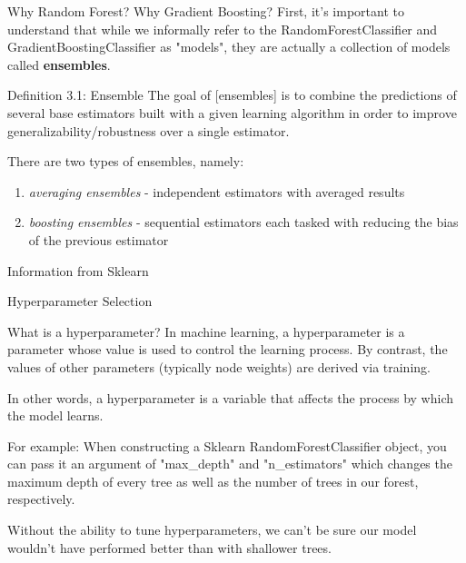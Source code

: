\documentclass[11pt]{beamer}
\begin{document}
\begin{frame}{Why Random Forest? Why Gradient Boosting?}
    First, it's important to understand that while we informally refer to the RandomForestClassifier and GradientBoostingClassifier as "models", they are actually a collection of models called \textbf{ensembles}.

    \vspace{3mm}
    
    \begin{block}{Definition 3.1: Ensemble }
    The goal of [ensembles] is to combine the predictions of several base estimators built with a given learning algorithm in order to improve generalizability/robustness over a single estimator. 
    \end{block}

    \vspace{3mm}

    There are two types of ensembles, namely:
    \begin{enumerate}
        \item \textit{averaging ensembles} - independent estimators with averaged results
        \item \textit{boosting ensembles} - sequential estimators each tasked with reducing the bias of the previous estimator
    \end{enumerate}

    \vspace{5mm}

    
    Information from Sklearn \cite{ensembleInfo}
\end{frame}

\begin{frame}{Hyperparameter Selection}
    \begin{block}{What is a hyperparameter?}
    In machine learning, a hyperparameter is a parameter whose value is used to control the learning process. By contrast, the values of other parameters (typically node weights) are derived via training. \cite{hyperparam}
    \end{block}

    \vspace{3mm}

    \par In other words, a hyperparameter is a variable that affects the process by which the model learns.
    
    \vspace{3mm}
    
    \par For example: When constructing a Sklearn RandomForestClassifier object, you can pass it an argument of "max\_depth" and "n\_estimators" which changes the maximum depth of every tree as well as the number of trees in our forest, respectively.
    
    \vspace{3mm}
    
    \par Without the ability to tune hyperparameters, we can't be sure our model wouldn't have performed better than with shallower trees.
    
    \vspace{3mm}
\end{frame}
\end{document}
